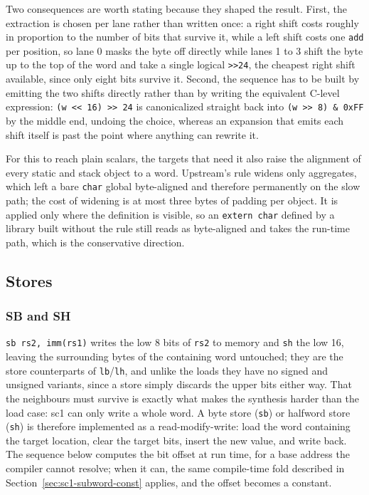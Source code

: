 Two consequences are worth stating because they shaped the result. First, the extraction is chosen per
lane rather than written once: a right shift costs roughly in proportion to the number of bits that
survive it, while a left shift costs one \texttt{add} per position, so lane 0 masks the byte off
directly while lanes 1 to 3 shift the byte up to the top of the word and take a single logical
\texttt{>>24}, the cheapest right shift available, since only eight bits survive it. Second, the
sequence has to be built by emitting the two shifts directly rather than by writing the equivalent
C-level expression: \texttt{(w << 16) >> 24} is canonicalized straight back into
\texttt{(w >> 8) \& 0xFF} by the middle end, undoing the choice, whereas an expansion that emits each
shift itself is past the point where anything can rewrite it.

For this to reach plain scalars, the targets that need it also raise the alignment of every static and
stack object to a word. Upstream's rule widens only aggregates, which left a bare \texttt{char} global
byte-aligned and therefore permanently on the slow path; the cost of widening is at most three bytes
of padding per object. It is applied only where the definition is visible, so an \texttt{extern char}
defined by a library built without the rule still reads as byte-aligned and takes the run-time path,
which is the conservative direction.

\subsection{Stores} \label{sec:sc1-stores}

\subsubsection{SB and SH} \label{sec:sc1-sb}

\texttt{sb rs2, imm(rs1)} writes the low 8 bits of \texttt{rs2} to memory and \texttt{sh} the
low 16, leaving the surrounding bytes of the containing word untouched; they are the store
counterparts of \texttt{lb}/\texttt{lh}, and unlike the loads they have no signed and unsigned
variants, since a store simply discards the upper bits either way. That the neighbours must survive
is exactly what makes the synthesis harder than the load case: sc1 can only write a whole word.
A byte store (\texttt{sb}) or halfword store (\texttt{sh}) is therefore implemented as a
read-modify-write:
load the word containing the target location, clear the target bits, insert the new value, and write
back. The sequence below computes the bit offset at run time, for a base address the compiler cannot
resolve; when it can, the same compile-time fold described in Section~\ref{sec:sc1-subword-const}
applies, and the offset becomes a constant.


